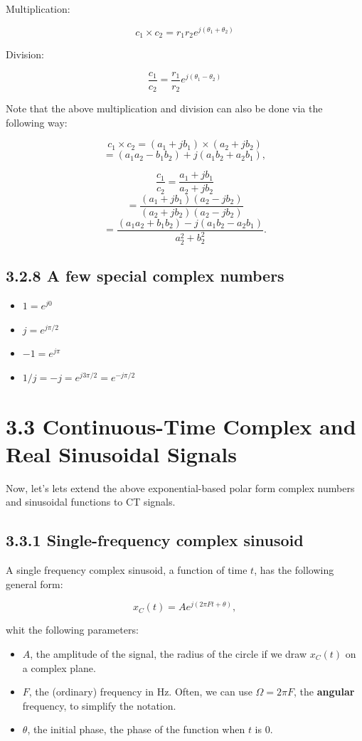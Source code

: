 \documentclass[11pt]{article}
\begin{document}
Multiplication:

\[c_1 \times c_2 = r_1 r_2 e^{j(\theta_1 + \theta_2)}\]

Division:

\[\frac{c_1}{c_2} = \frac{r_1}{r_2} e^{j(\theta_1 - \theta_2)}\]

Note that the above multiplication and division can also be done via the following way:

\[c_1 \times c_2 = (a_1 + jb_1) \times (a_2 + jb_2)\]
\[= (a_1 a_2 - b_1 b_2) + j(a_1 b_2 + a_2 b_1),\]

\[\frac{c_1}{c_2} = \frac{a_1 + jb_1}{a_2 + jb_2}\]
\[= \frac{(a_1 + jb_1)(a_2 - jb_2)}{(a_2 + jb_2)(a_2 - jb_2)}\]
\[= \frac{(a_1 a_2 + b_1 b_2) - j(a_1 b_2 - a_2 b_1)}{a_2^2 + b_2^2}.\]

\subsection*{3.2.8 A few special complex numbers}

\begin{itemize}
  \item $1 = e^{j0}$
  \item $j = e^{j\pi/2}$
  \item $-1 = e^{j\pi}$
  \item $1/j = -j = e^{j3\pi/2} = e^{-j\pi/2}$
\end{itemize}

\section*{3.3 Continuous-Time Complex and Real Sinusoidal Signals}

Now, let's lets extend the above exponential-based polar form complex numbers and sinusoidal functions to CT signals.

\subsection*{3.3.1 Single-frequency complex sinusoid}

A single frequency complex sinusoid, a function of time $t$, has the following general form:

\[x_C(t) = A e^{j(2\pi F t + \theta)},\]

whit the following parameters:

\begin{itemize}
  \item $A$, the amplitude of the signal, the radius of the circle if we draw $x_C(t)$ on a complex plane.
  \item $F$, the (ordinary) frequency in Hz. Often, we can use $\Omega = 2\pi F$, the \textbf{angular} frequency, to simplify the notation.
  \item $\theta$, the initial phase, the phase of the function when $t$ is 0.
\end{itemize}
\end{document}
